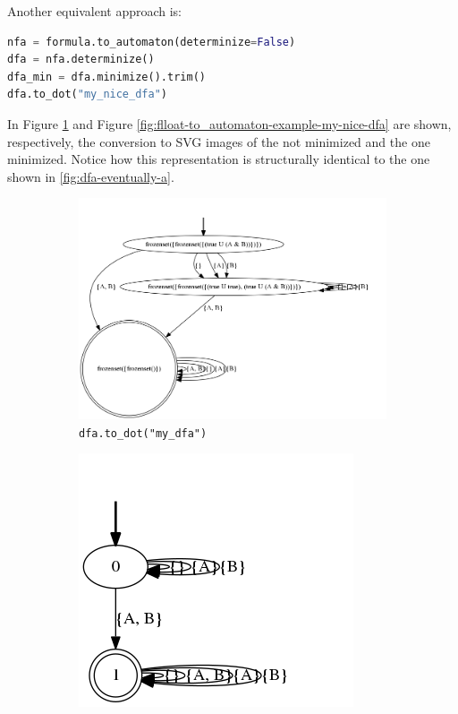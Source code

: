 Another equivalent approach is:
\begin{lstlisting}[language=Python, style=Python]
nfa = formula.to_automaton(determinize=False)
dfa = nfa.determinize()
dfa_min = dfa.minimize().trim()
dfa.to_dot("my_nice_dfa")
\end{lstlisting}


In Figure \ref{fig:flloat-to_automaton-example-my-dfa} and Figure \ref{fig:flloat-to_automaton-example-my-nice-dfa} are shown, respectively, the conversion to SVG images of the \DFA not minimized and the one minimized.
Notice how this representation is structurally identical to the one shown in \ref{fig:dfa-eventually-a}.
\begin{figure}[h]
	\centering
	\begin{subfigure}[b]{0.75\textwidth}
		\includegraphics[width=\textwidth]{images/my_dfa}
		\caption{\texttt{dfa.to\_dot("my\_dfa")}}
		\label{fig:flloat-to_automaton-example-my-dfa}
	\end{subfigure}
	\begin{subfigure}[b]{0.40\textwidth}
		\includegraphics[width=\textwidth]{images/my_nice_dfa}

\end{subfigure}
\end{figure}
